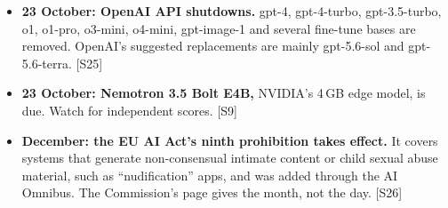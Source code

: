 \documentclass[11pt,a4paper]{article}
\newcommand{\srcref}[1]{\textcolor{brandaccent}{[S#1]}}
\begin{document}
\begin{itemize}
  \item \textbf{23 October: OpenAI API shutdowns.} gpt-4, gpt-4-turbo, gpt-3.5-turbo, o1, o1-pro, o3-mini, o4-mini, gpt-image-1
  and several fine-tune bases are removed. OpenAI's suggested replacements are mainly gpt-5.6-sol and gpt-5.6-terra. \srcref{25}
  \item \textbf{23 October: Nemotron 3.5 Bolt E4B,} NVIDIA's 4\,GB edge model, is due. Watch for independent scores. \srcref{9}
  \item \textbf{December: the EU AI Act's ninth prohibition takes effect.} It covers systems that generate non-consensual intimate content or
  child sexual abuse material, such as ``nudification'' apps, and was added through the AI Omnibus. The Commission's page gives the month, not the day. \srcref{26}
\end{itemize}

\clearpage
\end{document}
